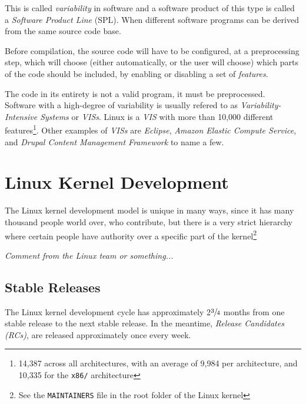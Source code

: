 \documentclass[a4paper,11pt]{report}
\newcommand{\textcode}[1]{
    \fboxsep=1pt
    \texttt{\colorbox{gray!20}{#1}}
}
\begin{document}
This is called \emph{variability} in software and a software product of 
this type is called a \emph{Software Product Line} (SPL). When different 
software programs can be derived from the same source code base. 

Before compilation, the source code will have to be configured, at a 
preprocessing step, which will choose (either automatically, or the user will 
choose) which parts of the code should be included, by enabling or disabling a 
set of \emph{features}. 

The code in its entirety is not a valid program, it must be preprocessed.
    \cite[p. 1]{IntDatSPL}
\\

Software with a high-degree of variability is usually refered to as 
\emph{Variability-Intensive Systems} or \emph{VISs}. Linux is a \emph{VIS} with 
more than 10,000 different features\footnote
    {14,387 across all architectures, with an average of 9,984 per 
    architecture, and 10,335 for the \texttt{x86/} architecture}.
Other examples of \emph{VISs} are 
\emph{Eclipse}, \emph{Amazon Elastic Compute Service}, and \emph{Drupal Content 
Management Framework}\cite
    [p. 1]{VarTesDrupal} to name a few.
\\


        \section{Linux Kernel Development}
The Linux kernel development model is unique in many ways, since it has many 
thousand people world over, who contribute, but there is a very strict 
hierarchy where certain people have authority over a specific part of the 
kernel\footnote
    {See the \textcode{MAINTAINERS} file in the root folder of the Linux kernel}

\begin{center}


    \emph{
        Comment from the Linux team or something...
    }
\end{center}


        \subsection*{Stable Releases}

The Linux kernel development cycle has approximately 2$\sfrac{3}{4}$ months 
from one stable release to the next stable release\cite
    {crystalball}.
In the meantime, \emph{Release Candidates (RCs)}, are released approximately 
once every week.
\end{document}
